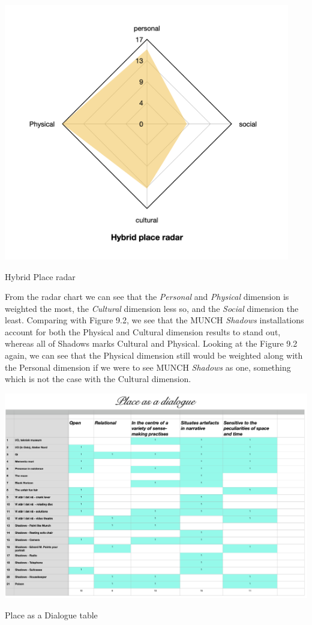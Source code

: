 \begin{table}[H]
  \includegraphics[width=12.5cm]{pictures/analysis/hybrid_radar.png}
    \caption{Hybrid Place radar}
\end{table}


From the radar chart we can see that the \textit{Personal} and \textit{Physical} dimension is weighted the most, the \textit{Cultural} dimension less so, and the \textit{Social} dimension the least. Comparing with Figure 9.2, we see that the MUNCH \textit{Shadows} installations account for both the Physical and Cultural dimension results to stand out, whereas all of Shadows marks Cultural and Physical. Looking at the Figure 9.2 again, we can see that the Physical dimension still would be weighted along with the Personal dimension if we were to see MUNCH \textit{Shadows} as one, something which is not the case with the Cultural dimension.


\begin{table}[H]
    \includegraphics[width=20cm, angle=90]{pictures/analysis/place.png}
    \caption{Place as a Dialogue table}
    \centering 
\end{table}

